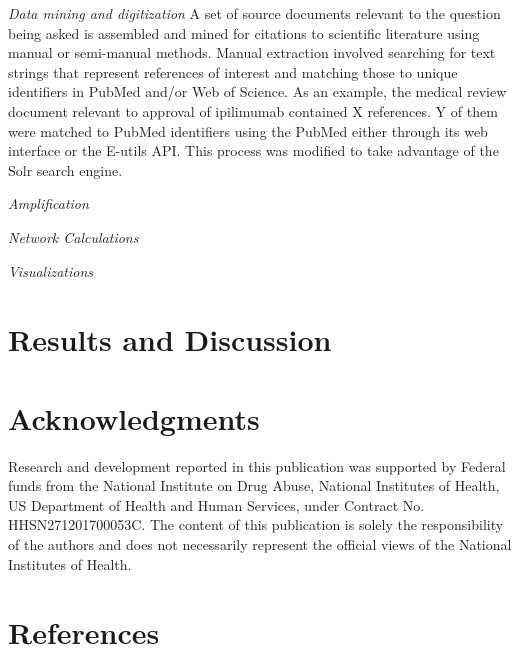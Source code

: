 \documentclass[review]{elsarticle}
\begin{document}
\emph{Data mining and digitization} A set of source documents relevant to the question being asked is assembled and mined for citations to scientific literature using manual or semi-manual methods. Manual extraction involved searching for text strings that represent references of interest and matching those to unique identifiers in PubMed and/or Web of Science. As an example, the medical review document relevant to approval of ipilimumab contained X references. Y of them were matched to PubMed identifiers using the PubMed either through its web interface or the E-utils API. This process was modified to take advantage of the Solr search engine. 

\emph{Amplification}

\emph{Network Calculations}

\emph{Visualizations}

\section*{Results and Discussion} 
\section*{Acknowledgments} Research and development reported in this publication was supported by Federal funds from the National Institute on Drug Abuse, National Institutes of Health, US Department of Health and Human Services, under Contract No. HHSN271201700053C. The content of this publication is solely the responsibility of the authors and does not necessarily represent the official views of the National Institutes of Health.


\section*{References}

 
\end{document}
